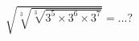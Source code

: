 \documentclass[preview]{standalone}
\begin{document}
\begin{align*}
\sqrt{\sqrt[3]{\sqrt[3]{3^5 \times 3^6 \times 3^7}}} =\dots?
\end{align*}
\end{document}
